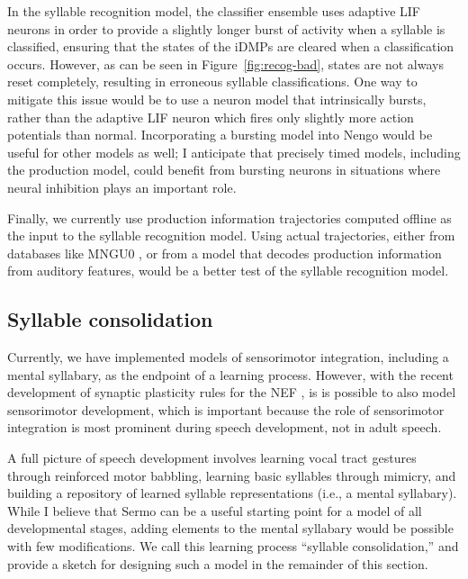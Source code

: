 In the syllable recognition model,
the classifier ensemble uses adaptive LIF neurons
in order to provide a slightly longer
burst of activity when a syllable is classified,
ensuring that the states
of the iDMPs are cleared
when a classification occurs.
However, as can be seen in Figure~\ref{fig:recog-bad},
states are not always reset completely,
resulting in erroneous syllable classifications.
One way to mitigate this issue
would be to use a neuron model
that intrinsically bursts,
rather than the adaptive LIF neuron
which fires only slightly more
action potentials than normal.
Incorporating a bursting model
into Nengo would be useful for other models as well;
I anticipate that precisely timed models,
including the production model,
could benefit from bursting neurons
in situations where neural inhibition
plays an important role.

Finally, we currently use
production information trajectories
computed offline as the input to
the syllable recognition model.
Using actual trajectories,
either from databases like
MNGU0 \citep{steiner2012},
or from a model that decodes
production information from
auditory features,
would be a better test
of the syllable recognition model.

\subsection{Syllable consolidation}
\label{sec:syllable-learning}

Currently, we have implemented models
of sensorimotor integration,
including a mental syllabary,
as the endpoint of a learning process.
However, with the recent development
of synaptic plasticity rules
for the NEF
\citep{macneil2011,bekolay2013a},
is is possible to also model
sensorimotor development,
which is important because
the role of sensorimotor integration
is most prominent during speech development,
not in adult speech.

A full picture of speech development involves
learning vocal tract gestures
through reinforced motor babbling,
learning basic syllables
through mimicry,
and building a repository of
learned syllable representations
(i.e., a mental syllabary).
While I believe that Sermo can be
a useful starting point for a
model of all developmental stages,
adding elements to the mental syllabary
would be possible with few modifications.
We call this learning process
``syllable consolidation,''
and provide a sketch for designing
such a model in the remainder of this section.

